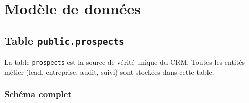 \documentclass[11pt,a4paper]{report}
\begin{document}
\chapter{Modèle de données}

\section{Table \texttt{public.prospects}}

La table \texttt{prospects} est la source de vérité unique du CRM. Toutes les entités métier (lead, entreprise, audit, suivi) sont stockées dans cette table.

\subsection{Schéma complet}
\end{document}
